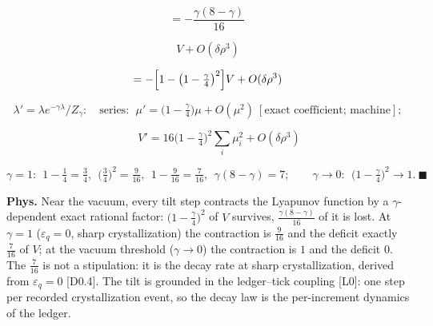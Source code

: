 \begin{theorem}
\[
= -\frac{\gamma(8-\gamma)}{16}\,
\]

\[
V+O(\delta\rho^3)
\]

\[
= -\Bigl[1-\bigl(1-\tfrac\gamma4\bigr)^2\Bigr]V+O(\delta\rho^3)
\]

\[
\lambda'=\lambda e^{-\gamma\lambda}/Z_\gamma:\quad\text{series}:\ \ \mu'=\bigl(1-\tfrac\gamma4\bigr)\mu+O(\mu^2)\ [\text{exact coefficient; machine}];
\]

\[
\qquad V'=16\bigl(1-\tfrac\gamma4\bigr)^2\textstyle\sum_i\mu_i^2+O(\delta\rho^3)
\]

\[
\gamma=1:\ \ 1-\tfrac14=\tfrac34,\ \ \bigl(\tfrac34\bigr)^2=\tfrac9{16},\ \ 1-\tfrac9{16}=\tfrac7{16},\ \ \gamma(8-\gamma)=7;\qquad
\gamma\to0:\ \ \bigl(1-\tfrac\gamma4\bigr)^2\to1.\ \blacksquare
\]

\textbf{Phys.} Near the vacuum, every tilt step contracts the Lyapunov function by a $\gamma$-dependent exact rational factor: $\bigl(1-\tfrac\gamma4\bigr)^2$ of $V$ survives, $\tfrac{\gamma(8-\gamma)}{16}$ of it is lost. At $\gamma=1$ ($\varepsilon_q=0$, sharp crystallization) the contraction is $\tfrac9{16}$ and the deficit exactly $\tfrac7{16}$ of $V$; at the vacuum threshold ($\gamma\to0$) the contraction is $1$ and the deficit $0$. The $\tfrac7{16}$ is not a stipulation: it is the decay rate at sharp crystallization, derived from $\varepsilon_q=0$ [D0.4]. The tilt is grounded in the ledger–tick coupling [L0]: one step per recorded crystallization event, so the decay law is the per-increment dynamics of the ledger.

\end{theorem}

